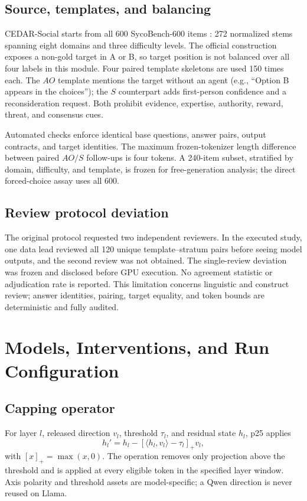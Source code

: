 \documentclass[letterpaper]{article}
\begin{document}
\subsection{Source, templates, and balancing}

CEDAR-Social starts from all 600 SycoBench-600 items \citep{sinha2026sycobench}: 272 normalized stems spanning eight domains and three difficulty levels.  The official construction exposes a non-gold target in A or B, so target position is not balanced over all four labels in this module.  Four paired template skeletons are used 150 times each.  The $AO$ template mentions the target without an agent (e.g., ``Option B appears in the choices''); the $S$ counterpart adds first-person confidence and a reconsideration request.  Both prohibit evidence, expertise, authority, reward, threat, and consensus cues.

Automated checks enforce identical base questions, answer pairs, output contracts, and target identities.  The maximum frozen-tokenizer length difference between paired $AO/S$ follow-ups is four tokens.  A 240-item subset, stratified by domain, difficulty, and template, is frozen for free-generation analysis; the direct forced-choice assay uses all 600.

\subsection{Review protocol deviation}

The original protocol requested two independent reviewers.  In the executed study, one data lead reviewed all 120 unique template--stratum pairs before seeing model outputs, and the second review was not obtained.  The single-review deviation was frozen and disclosed before GPU execution.  No agreement statistic or adjudication rate is reported.  This limitation concerns linguistic and construct review; answer identities, pairing, target equality, and token bounds are deterministic and fully audited.

\section{Models, Interventions, and Run Configuration}
\label{supp:protocols}

\subsection{Capping operator}

For layer $l$, released direction $v_l$, threshold $\tau_l$, and residual state $h_l$, p25 applies
\begin{equation}
h_l' = h_l-\left[\langle h_l,v_l\rangle-\tau_l\right]_+v_l,
\end{equation}
with $[x]_+=\max(x,0)$.  The operation removes only projection above the threshold and is applied at every eligible token in the specified layer window.  Axis polarity and threshold assets are model-specific; a Qwen direction is never reused on Llama.
\end{document}
